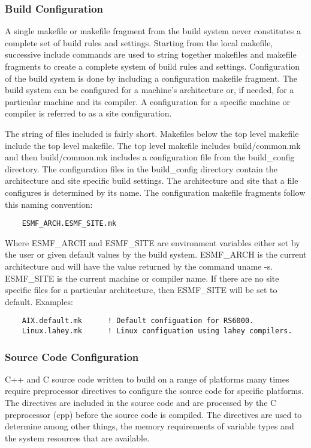 \subsubsection{Build Configuration}

A single makefile or makefile fragment from the build system never
constitutes a complete set of build rules and settings.  Starting from
the local makefile, successive include commands are used to string
together makefiles and makefile fragments to create a complete system
of build rules and settings.  Configuration of the build system is
done by including a configuration makefile fragment.  The build
system can be configured for a machine's architecture or, if needed,
for a particular machine and its compiler. A configuration for a
specific machine or compiler is referred to as a site configuration.

The string of files included is fairly short.  Makefiles below the top
level makefile include the top level makefile. The top level makefile
includes build/common.mk and then build/common.mk includes a
configuration file from the build\_config directory.  The configuration
files in the build\_config directory contain the architecture and site
specific build settings.  The architecture and site that a file
configures is determined by its name.  The configuration makefile
fragments follow this naming convention:

\begin{verbatim}
    ESMF_ARCH.ESMF_SITE.mk
\end{verbatim}

Where ESMF\_ARCH and ESMF\_SITE are environment variables either set by
the user or given default values by the build system. ESMF\_ARCH is the
current architecture and will have the value returned by the command
uname -s.  ESMF\_SITE is the current machine or compiler name. If there
are no site specific files for a particular architecture, then
ESMF\_SITE will be set to default.  Examples:

\begin{verbatim}
    AIX.default.mk      ! Default configuation for RS6000.
    Linux.lahey.mk      ! Linux configuation using lahey compilers.
\end{verbatim}

\subsubsection{Source Code Configuration}

C++ and C source code written to build on a range of platforms many
times require preprocessor directives to configure the source code for
specific platforms.  The directives are included in the source code
and are processed by the C preprocessor (cpp) before the source code
is compiled.  The directives are used to determine among other things,
the memory requirements of variable types and the system resources
that are available.

